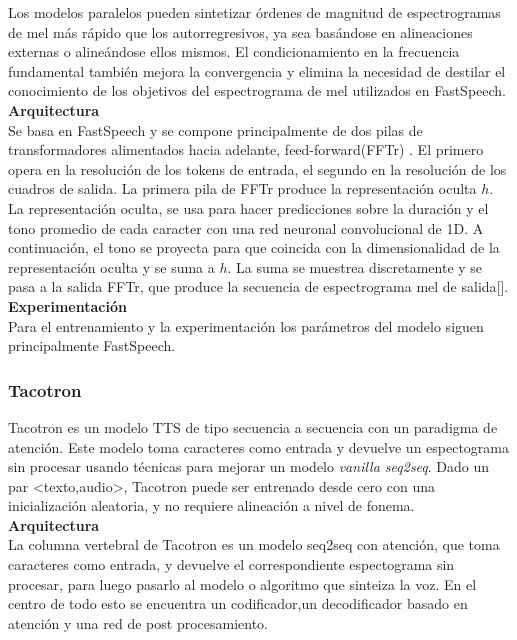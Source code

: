 Los modelos paralelos pueden sintetizar órdenes de magnitud de espectrogramas de mel más rápido que los autorregresivos, ya sea basándose en alineaciones externas o alineándose ellos mismos. El condicionamiento en la frecuencia fundamental también mejora la convergencia y elimina la necesidad de destilar el conocimiento de los objetivos del espectrograma de mel utilizados en FastSpeech.\\

\textbf{Arquitectura}\\

Se basa en FastSpeech y se compone principalmente de dos pilas de transformadores alimentados hacia adelante, feed-forward(FFTr) . El primero opera en la resolución de los tokens de entrada, el segundo en la resolución de los cuadros de salida.
La primera pila de FFTr produce la representación oculta $h$. La representación oculta, se usa para hacer predicciones sobre la duración y el tono promedio de cada caracter con una red neuronal convolucional de 1D.  A continuación, el tono se proyecta para que coincida con la dimensionalidad de la representación oculta y se suma a $h$. La suma se muestrea discretamente y se pasa a la salida FFTr, que produce la secuencia de espectrograma mel de salida[\cite{lancucki2021fastpitch}].\\

\textbf{Experimentación} \\
Para el entrenamiento y la experimentación los parámetros del modelo siguen principalmente FastSpeech.


\subsubsection{Tacotron}

Tacotron es un modelo TTS de tipo secuencia a secuencia con un paradigma de atención. Este modelo toma caracteres como entrada y devuelve un espectograma sin procesar usando técnicas para mejorar un modelo \textit{vanilla seq2seq}. Dado un par <texto,audio>, Tacotron puede ser entrenado desde cero con una inicialización aleatoria, y no requiere alineación a nivel de fonema.\\

\textbf{Arquitectura} \\

La columna vertebral de Tacotron es un modelo seq2seq con atención, que toma caracteres como entrada, y devuelve el correspondiente espectograma sin procesar, para luego pasarlo al modelo o algoritmo que sinteiza la voz. En el centro de todo esto se encuentra un codificador,un decodificador basado en atención y una red de post procesamiento.\\

